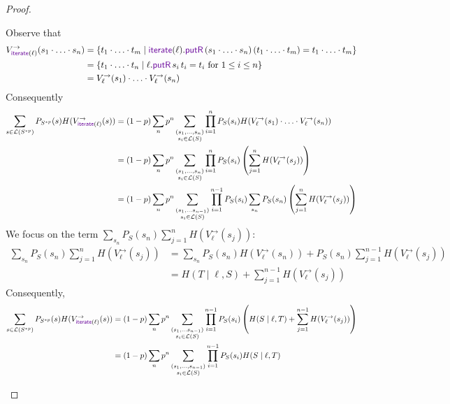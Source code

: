 \documentclass[acmsmall,screen,anonymous]{acmart}
\begin{document}
\begin{proof}
\begin{enumerate}
Observe that 
\begin{align*}
V^{\rightarrow}_{\IterateLensOf{\Lens}}(s_1 \cdot \ldots \cdot s_n) &= \{t_1 \cdot \ldots \cdot t_m \; | \; \IterateLensOf{\Lens}.\PutROf{(s_1 \cdot \ldots \cdot s_n) }{(t_1 \cdot \ldots \cdot t_m)} = t_1 \cdot \ldots \cdot t_m\}\\
&= \{t_1 \cdot \ldots \cdot t_n \; | \; \ell.\PutROf{s_i}{t_i} = t_i \text{ for }1 \leq i \leq n\}\\
&= V^{\rightarrow}_{\ell}(s_1) \cdot \ldots \cdot V^{\rightarrow}_{\ell}(s_n)
\end{align*}
Consequently
\begin{align*}
\sum_{s \in \mathcal{L}(S^{*p})}P_{S^{*p}}(s) H(V^{\rightarrow}_{\IterateLensOf{\Lens}}(s))
&= (1-p)\sum_n p^n \sum_{\substack{(s_1, \ldots, s_n)\\s_i \in \mathcal{L}(S)}} \prod_{i=1}^n P_S(s_i) H(V^{\rightarrow}_{\ell}(s_1) \cdot \ldots \cdot V^{\rightarrow}_{\ell}(s_n))\\
&= (1-p)\sum_n p^n \sum_{\substack{(s_1, \ldots, s_n)\\s_i \in \mathcal{L}(S)}} \prod_{i=1}^n P_S(s_i) \left(\sum_{j=1}^n H(V^{\rightarrow}_{\ell}(s_j)) \right)\\
&= (1-p)\sum_n p^n \sum_{\substack{(s_1, \ldots s_{n-1}) \\ s_i \in \mathcal{L}(S)}} \prod_{i=1}^{n-1}P_S(s_i) \sum_{s_n} P_S(s_n) \left(\sum_{j=1}^n H(V^{\rightarrow}_{\ell}(s_j)) \right)
\end{align*}
We focus on the term $\sum_{s_n} P_S(s_n) \sum_{j=1}^n H(V^{\rightarrow}_{\ell}(s_j))$:
\begin{align*}
\sum_{s_n} P_S(s_n) \sum_{j=1}^n H(V^{\rightarrow}_{\ell}(s_j)) &= \sum_{s_n} P_S(s_n)H(V^{\rightarrow}_{\ell}(s_n)) + P_S(s_n) \sum_{j=1}^{n-1} H(V^{\rightarrow}_{\ell}(s_j))\\
&= H(T \; | \; \ell, S) + \sum_{j=1}^{n-1}H(V^{\rightarrow}_{\ell}(s_j))
\end{align*}
Consequently,
\begin{align*}
\sum_{s \in \mathcal{L}(S^{*p})}P_{S^{*p}}(s) H(V^{\rightarrow}_{\IterateLensOf{\Lens}}(s))
&= (1-p)\sum_n p^n \sum_{\substack{(s_1, \ldots s_{n-1}) \\ s_i \in \mathcal{L}(S)}} \prod_{i=1}^{n-1}P_S(s_i) \left( H(S \; | \; \ell, T) + \sum_{j=1}^{n-1}H(V^{\rightarrow}_{\ell}(s_j))\right)\\
&= (1-p)\sum_n p^n \sum_{\substack{(s_1, \ldots, s_{n-1})\\s_i \in \mathcal{L}(S)}} \prod_{i=1}^{n-1}P_S(s_i) H(S \; | \; \ell, T)\\

\end{align*}
\end{enumerate}
\end{proof}
\end{document}
